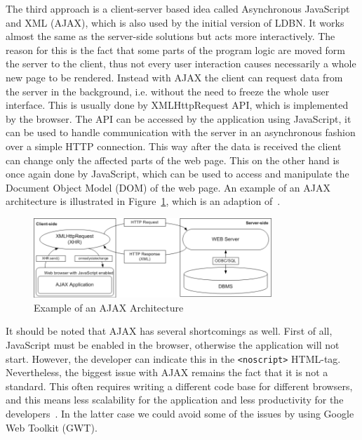 The third approach is
a client-server based idea called Asynchronous JavaScript and XML (AJAX),
which is also used by the initial version of LDBN. 
It works almost the same as the server-side solutions but acts more interactively. The
reason for this is the fact that some parts of the program logic are moved form the server
to the client, thus not every user interaction causes necessarily a whole new page
to be rendered. Instead with AJAX the client can request 
data from the server in the background, i.e. without the need to freeze the whole user interface. 
This is usually done by XMLHttpRequest API, which is implemented
by the browser. The API can be accessed by the application using JavaScript, it can be
used to handle communication with the server in an asynchronous fashion over a
simple HTTP connection.
This way after the data is received the client can change only the affected parts of the web page. 
This on the other hand is once again done by JavaScript, which 
can be used to access and manipulate the Document Object Model (DOM) of the web page.
An example of an AJAX architecture is illustrated in Figure~\ref{fig:ajax01}, 
which is an adaption of~\cite[Figure 3.1]{mt1}.

\begin{figure}[h]
	\begin{center}
		\includegraphics[width=0.8\textwidth]{./img/ajax01a.png}
		\caption{Example of an AJAX Architecture}
		\label{fig:ajax01}
	\end{center}
\end{figure}


It should be noted that AJAX has several shortcomings as well. First of all, 
JavaScript must be enabled in the browser, otherwise the application will not start.
However, the developer can indicate this in the \verb=<noscript>= HTML-tag. 
Nevertheless, the biggest issue with AJAX remains the fact that it is not a
standard. This often requires writing a different code base for different
browsers, and this means less scalability for the application and less productivity for
the developers~\cite{bgwt2}. In the latter case we could avoid some of the issues by using 
Google Web Toolkit (GWT).

